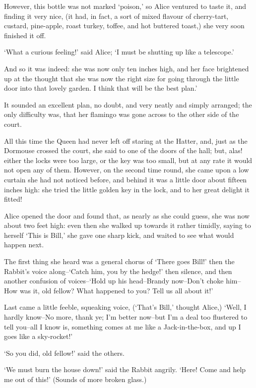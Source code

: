 \documentclass[statementpaper,twoside,openany]{memoir}
\begin{document}
However, this bottle was not marked `poison,' so Alice ventured to taste it, and finding it very nice, (it had, in fact, a sort of mixed flavour of cherry-tart, custard, pine-apple, roast turkey, toffee, and hot buttered toast,) she very soon finished it off.

`What a curious feeling!' said Alice; `I must be shutting up like a telescope.'

And so it was indeed: she was now only ten inches high, and her face brightened up at the thought that she was now the right size for going through the little door into that lovely garden. I think that will be the best plan.'

It sounded an excellent plan, no doubt, and very neatly and simply arranged; the only difficulty was, that her flamingo was gone across to the other side of the court.

All this time the Queen had never left off staring at the Hatter, and, just as the Dormouse crossed the court, she said to one of the doors of the hall; but, alas! either the locks were too large, or the key was too small, but at any rate it would not open any of them. However, on the second time round, she came upon a low curtain she had not noticed before, and behind it was a little door about fifteen inches high: she tried the little golden key in the lock, and to her great delight it fitted!

Alice opened the door and found that, as nearly as she could guess, she was now about two feet high: even then she walked up towards it rather timidly, saying to herself `This is Bill,' she gave one sharp kick, and waited to see what would happen next.

The first thing she heard was a general chorus of `There goes Bill!' then the Rabbit's voice along--`Catch him, you by the hedge!' then silence, and then another confusion of voices--`Hold up his head--Brandy now--Don't choke him--How was it, old fellow? What happened to you? Tell us all about it!'

Last came a little feeble, squeaking voice, (`That's Bill,' thought Alice,) `Well, I hardly know--No more, thank ye; I'm better now--but I'm a deal too flustered to tell you--all I know is, something comes at me like a Jack-in-the-box, and up I goes like a sky-rocket!'

`So you did, old fellow!' said the others.

`We must burn the house down!' said the Rabbit angrily. `Here! Come and help me out of this!' (Sounds of more broken glass.)
\end{document}
